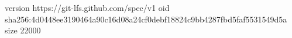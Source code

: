 version https://git-lfs.github.com/spec/v1
oid sha256:4d0448ee3190464a90c16d08a24cf0debf18824c9bb4287fbd5faf5531549d5a
size 22000
